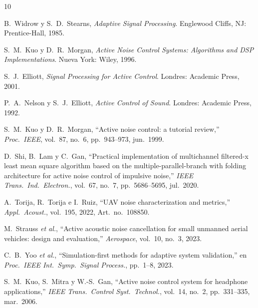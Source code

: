 \documentclass[journal,12pt,onecolumn]{IEEEtran}
\begin{document}

\begin{thebibliography}{10}

B.~Widrow y S.~D.~Stearns,
\emph{Adaptive Signal Processing}.
Englewood Cliffs, NJ: Prentice-Hall, 1985.

S.~M.~Kuo y D.~R.~Morgan,
\emph{Active Noise Control Systems: Algorithms and DSP Implementations}.
Nueva York: Wiley, 1996.

S.~J.~Elliott,
\emph{Signal Processing for Active Control}.
Londres: Academic Press, 2001.

P.~A.~Nelson y S.~J.~Elliott,
\emph{Active Control of Sound}.
Londres: Academic Press, 1992.

S.~M.~Kuo y D.~R.~Morgan,
``Active noise control: a tutorial review,''
\emph{Proc.\ IEEE}, vol.~87, no.~6, pp.~943--973, jun.\ 1999.

D.~Shi, B.~Lam y C.~Gan,
``Practical implementation of multichannel filtered-x least mean square
algorithm based on the multiple-parallel-branch with folding architecture
for active noise control of impulsive noise,''
\emph{IEEE Trans.\ Ind.\ Electron.}, vol.~67, no.~7,
pp.~5686--5695, jul.\ 2020.

A.~Torija, R.~Torija e I.~Ruiz,
``UAV noise characterization and metrics,''
\emph{Appl.\ Acoust.}, vol.~195, 2022, Art.\ no.~108850.

M.~Strauss \emph{et al.},
``Active acoustic noise cancellation for small unmanned aerial vehicles:
design and evaluation,''
\emph{Aerospace}, vol.~10, no.~3, 2023.

C.~B.~Yoo \emph{et al.},
``Simulation-first methods for adaptive system validation,''
en \emph{Proc.\ IEEE Int.\ Symp.\ Signal Process.}, pp.~1--8, 2023.

S.~M.~Kuo, S.~Mitra y W.-S.~Gan,
``Active noise control system for headphone applications,''
\emph{IEEE Trans.\ Control Syst.\ Technol.}, vol.~14, no.~2,
pp.~331--335, mar.\ 2006.

\end{thebibliography}
\end{document}
